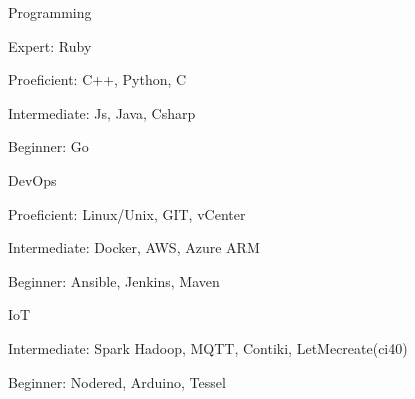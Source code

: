 

\begin{cvskills}

  \cvskill
    {Programming}
    {
      \begin{cvitems} %
        \item Expert:\hspace{8.3mm} Ruby
        \item Proeficient:\hspace{2.5mm} C++, Python, C
        \item Intermediate:              Js, Java, Csharp
        \item Beginner:\hspace{5mm}      Go
      \end{cvitems}
    }
  \cvskill
    {DevOps} %
    {
      \begin{cvitems} %
        \item Proeficient:\hspace{2.5mm} Linux/Unix, GIT, vCenter
        \item Intermediate:              Docker, AWS, Azure ARM
        \item Beginner:\hspace{5mm}      Ansible, Jenkins, Maven
      \end{cvitems}
    }

  \cvskill
    {IoT} %
    {
      \begin{cvitems} %
      \item Intermediate:             Spark Hadoop, MQTT, Contiki, LetMecreate(ci40)
      \item Beginner:\hspace{5mm}     Nodered, Arduino, Tessel
      \end{cvitems}
    }


\end{cvskills}
